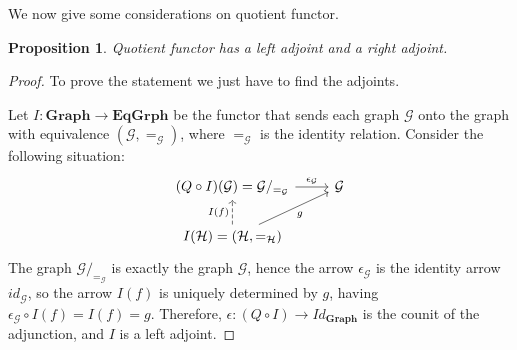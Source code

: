 \documentclass[a4paper, twoside,openright]{report}
\theoremstyle{plain}
\newtheorem{prop}[theorem]{Proposition}
\theoremstyle{definition}
\begin{document}
We now give some considerations on quotient functor.

\begin{prop}
    Quotient functor has a left adjoint and a right adjoint.
\end{prop}

\begin{proof}
    To prove the statement we just have to find the adjoints. 

     Let $I: \mathbf{Graph \rightarrow EqGrph}$ be the functor  that sends each graph $\mathcal{G}$ onto the graph with equivalence $(\mathcal{G}, =_{\mathcal{G}})$, where $=_{\mathcal G}$ is the identity relation.
    Consider the following situation:
    \[
        \begin{tikzcd}
            (Q \circ I)(\mathcal{G}) = \mathcal{G}/_{=_{\mathcal{G}}}
            \arrow[r, "{\epsilon_{\mathcal{G}}}"] 
            & \mathcal{G} \\
            {I(\mathcal{H}) = (\mathcal{H}, =_{\mathcal{H}})}
            \arrow[u, dashed, "I(f)"] 
            \arrow[ur, "g"swap] 
        \end{tikzcd}
    \]
    The graph $\mathcal G/_{=_{\mathcal{G}}}$ is exactly the graph $\mathcal G$, hence the arrow $\epsilon_\mathcal{G}$ is the identity arrow $id_\mathcal{G}$, so the arrow $I(f)$ is uniquely determined by $g$, having $\epsilon_{\mathcal{G}} \circ I(f) = I(f) = g$. Therefore, $\epsilon: (Q \circ I) \rightarrow Id_{\mathbf{Graph}}$ is the counit of the adjunction, and $I$ is a left adjoint.


\end{proof}
\end{document}
